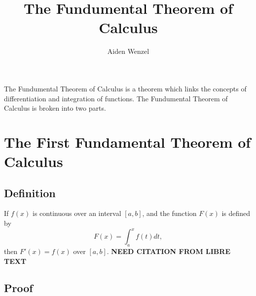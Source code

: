 \documentclass{article}
\title{The Fundumental Theorem of Calculus}
\author{Aiden Wenzel}
\begin{document}
   \maketitle 

    The Fundumental Theorem of Calculus is a theorem which links the concepts of differentiation and integration of functions. 
    The Fundumental Theorem of Calculus is broken into two parts. 

    \section{The First Fundamental Theorem of Calculus}
    \subsection{Definition}
    If $f(x)$ is continuous over an interval $[a,b]$, and the function $F(x)$ is defined by 
    \[F(x) = \int_a^x f(t)dt,\]
    then $F'(x) = f(x)$ over $[a,b]$. \textbf{NEED CITATION FROM LIBRE TEXT}

    \subsection{Proof}
    \[\]
\end{document}
